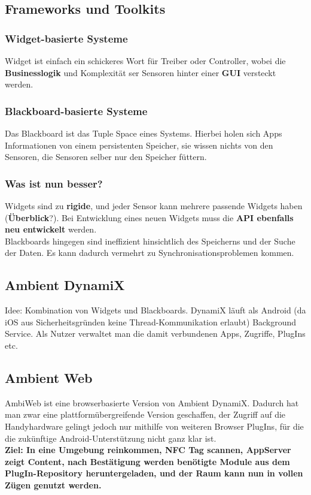 \documentclass[a4paper]{article}
\begin{document}
\subsection{Frameworks und Toolkits}
\subsubsection{Widget-basierte Systeme}
Widget ist einfach ein schickeres Wort für Treiber oder Controller, wobei die \textbf{Businesslogik} und Komplexität ser Sensoren hinter einer \textbf{GUI} versteckt werden.
\subsubsection{Blackboard-basierte Systeme}
Das Blackboard ist das Tuple Space eines Systems. Hierbei holen sich Apps Informationen von einem persistenten Speicher, sie wissen nichts von den Sensoren, die Sensoren selber nur den Speicher füttern.
\subsubsection{Was ist nun besser?}
Widgets sind zu \textbf{rigide}, und jeder Sensor kann mehrere passende Widgets haben (\textbf{Überblick}?). Bei Entwicklung eines neuen Widgets muss die \textbf{API ebenfalls neu entwickelt} werden. \\
Blackboards hingegen sind ineffizient hinsichtlich des Speicherns und der Suche der Daten. Es kann dadurch vermehrt zu Synchronisationsproblemen kommen.
\subsection{Ambient DynamiX}
Idee: Kombination von Widgets und Blackboards. DynamiX läuft als Android (da iOS aus Sicherheitsgründen keine Thread-Kommunikation erlaubt) Background Service. Als Nutzer verwaltet man die damit verbundenen Apps, Zugriffe, PlugIns etc.

\subsection{Ambient Web}
AmbiWeb ist eine browserbasierte Version von Ambient DynamiX. Dadurch hat man zwar eine plattformübergreifende Version geschaffen, der Zugriff auf die Handyhardware gelingt jedoch nur mithilfe von weiteren Browser PlugIns, für die die zukünftige Android-Unterstützung nicht ganz klar ist.\\

\textbf{Ziel: In eine Umgebung reinkommen, NFC Tag scannen, AppServer zeigt Content, nach Bestätigung werden benötigte Module aus dem PlugIn-Repository heruntergeladen, und der Raum kann nun in vollen Zügen genutzt werden.}
\end{document}

